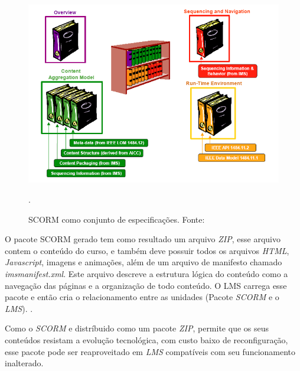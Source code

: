 \begin{figure}[h]
  \centering
  \label{fig:scorm-funcionamento-dutra}
  \includegraphics[keepaspectratio=true,scale=0.7]{figuras/scorm-funcionamento-dutra.png}
  \caption{SCORM como conjunto de especificações. Fonte: }.
\end{figure}
\par
O pacote \ac{SCORM} gerado tem como resultado um arquivo \textit{ZIP}, esse arquivo contem o conteúdo do curso, e também deve possuir todos os arquivos \textit{HTML}, \textit{Javascript}, imagens e animações, além de um arquivo de manifesto chamado \textit{imsmanifest.xml}. Este arquivo descreve a estrutura lógica do conteúdo como a navegação das páginas e a organização de todo conteúdo. O \ac{LMS} carrega esse pacote e então cria o relacionamento entre as unidades (Pacote \textit{SCORM} e o \textit{LMS}). \cite[p.~39]{fernandes-scorm}.
\par
Como o \textit{SCORM} e distríbuido como um pacote \textit{ZIP}, permite que os seus conteúdos resistam a evolução tecnológica, com custo baixo de reconfiguração, esse pacote pode ser reaproveitado em \textit{LMS} compatíveis com seu funcionamento inalterado.

